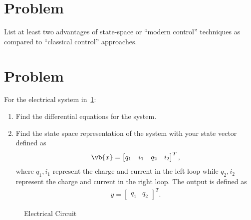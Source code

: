 \documentclass[titlepage, 11pt, reqno]{article}    %
\begin{document}
\section{Problem}

List at least two advantages of state-space or ``modern control'' techniques as compared to ``classical control'' approaches.
\vspace{5cm}
\clearpage
\section{Problem}

For the electrical system in~\cref{fig:elec_circuit_2}:
\begin{enumerate}
    \item Find the differential equations for the system.
    \item Find the state space representation of the system with your state vector defined as
        \begin{align*}
        \vb{x} = \begin{bmatrix}q_1 & i_1 & q_2 & i_2\end{bmatrix}^T,
        \end{align*}
        where \(q_1, i_1\) represent the charge and current in the left loop while \(q_2, i_2\) represent the charge and current in the right loop. 
        The output is defined as
        \begin{align*}
        y = \begin{bmatrix} q_1 & q_2 \end{bmatrix}^T.
        \end{align*}
\end{enumerate}
\begin{figure}[htbp]
\centering
\begin{scaletikzpicturetowidth}{0.8\textwidth}
\end{scaletikzpicturetowidth}
\caption{Electrical Circuit~\label{fig:elec_circuit_2}}
\end{figure}
\clearpage
\newpage
\mbox{}
\clearpage
\end{document}
